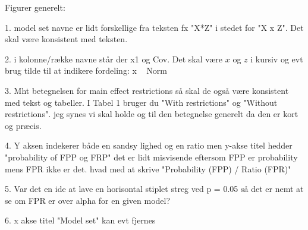 Figurer generelt:

1. model set navne er lidt forskellige fra teksten fx "X*Z" i stedet for "X x Z". Det skal være konsistent med teksten.

2. i kolonne/række navne står der x1 og Cov. Det skal være $x$ og $z$ i kursiv og evt brug tilde til at indikere fordeling: x ~ Norm

3. Mht betegnelsen for main effect restrictions så skal de også være konsistent med tekst og tabeller. I Tabel 1 bruger du "With restrictions" og "Without restrictions". jeg synes vi skal holde og til den betegnelse generelt da den er kort og præcis.

4. Y aksen indekerer både en sandsy lighed og en ratio men y-akse titel hedder "probability of FPP og FRP" det er lidt misvisende eftersom FPP er probability mens FPR ikke er det. hvad med at skrive "Probability (FPP) / Ratio (FPR)"

5. Var det en ide at lave en horisontal stiplet streg ved p = 0.05 så det er nemt at se om FPR er over alpha for en given model?

6. x akse titel "Model set" kan evt fjernes

